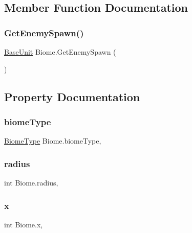 \subsection{Member Function Documentation}
\mbox{\label{class_biome_abfb2b6d9c6ae23d0d7f247e10b568a9e}} 
\subsubsection{\texorpdfstring{GetEnemySpawn()}{GetEnemySpawn()}}
{\footnotesize\ttfamily \mbox{\hyperlink{class_base_unit}{Base\+Unit}} Biome.\+Get\+Enemy\+Spawn (\begin{DoxyParamCaption}{ }\end{DoxyParamCaption})}



\subsection{Property Documentation}
\mbox{\label{class_biome_a0b8fc33054a627c978fa9d81573a9e1d}} 
\subsubsection{\texorpdfstring{biomeType}{biomeType}}
{\footnotesize\ttfamily \mbox{\hyperlink{class_biome_a7ddcfcc6d4e88c5eb73df6827df862da}{Biome\+Type}} Biome.\+biome\+Type\hspace{0.3cm}{\ttfamily [get]}, {\ttfamily [set]}}

\mbox{\label{class_biome_a71b951bc82d85f930f9c6135a79a2bbc}} 
\subsubsection{\texorpdfstring{radius}{radius}}
{\footnotesize\ttfamily int Biome.\+radius\hspace{0.3cm}{\ttfamily [get]}, {\ttfamily [set]}}

\mbox{\label{class_biome_ae63d1400ef2eaa0c520bec593aa2e90d}} 
\subsubsection{\texorpdfstring{x}{x}}
{\footnotesize\ttfamily int Biome.\+x\hspace{0.3cm}{\ttfamily [get]}, {\ttfamily [set]}}

